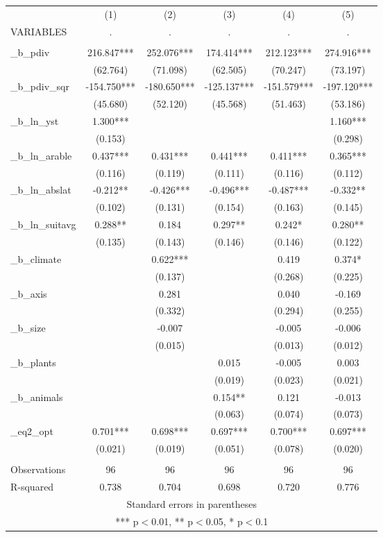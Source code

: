 \documentclass[]{article}
\begin{document}
\begin{tabular}{lccccc} \hline
 & (1) & (2) & (3) & (4) & (5) \\
VARIABLES & . & . & . & . & . \\ \hline
 &  &  &  &  &  \\
\_b\_pdiv & 216.847*** & 252.076*** & 174.414*** & 212.123*** & 274.916*** \\
 & (62.764) & (71.098) & (62.505) & (70.247) & (73.197) \\
\_b\_pdiv\_sqr & -154.750*** & -180.650*** & -125.137*** & -151.579*** & -197.120*** \\
 & (45.680) & (52.120) & (45.568) & (51.463) & (53.186) \\
\_b\_ln\_yst & 1.300*** &  &  &  & 1.160*** \\
 & (0.153) &  &  &  & (0.298) \\
\_b\_ln\_arable & 0.437*** & 0.431*** & 0.441*** & 0.411*** & 0.365*** \\
 & (0.116) & (0.119) & (0.111) & (0.116) & (0.112) \\
\_b\_ln\_abslat & -0.212** & -0.426*** & -0.496*** & -0.487*** & -0.332** \\
 & (0.102) & (0.131) & (0.154) & (0.163) & (0.145) \\
\_b\_ln\_suitavg & 0.288** & 0.184 & 0.297** & 0.242* & 0.280** \\
 & (0.135) & (0.143) & (0.146) & (0.146) & (0.122) \\
\_b\_climate &  & 0.622*** &  & 0.419 & 0.374* \\
 &  & (0.137) &  & (0.268) & (0.225) \\
\_b\_axis &  & 0.281 &  & 0.040 & -0.169 \\
 &  & (0.332) &  & (0.294) & (0.255) \\
\_b\_size &  & -0.007 &  & -0.005 & -0.006 \\
 &  & (0.015) &  & (0.013) & (0.012) \\
\_b\_plants &  &  & 0.015 & -0.005 & 0.003 \\
 &  &  & (0.019) & (0.023) & (0.021) \\
\_b\_animals &  &  & 0.154** & 0.121 & -0.013 \\
 &  &  & (0.063) & (0.074) & (0.073) \\
\_eq2\_opt & 0.701*** & 0.698*** & 0.697*** & 0.700*** & 0.697*** \\
 & (0.021) & (0.019) & (0.051) & (0.078) & (0.020) \\
 &  &  &  &  &  \\
Observations & 96 & 96 & 96 & 96 & 96 \\
 R-squared & 0.738 & 0.704 & 0.698 & 0.720 & 0.776 \\ \hline
\multicolumn{6}{c}{ Standard errors in parentheses} \\
\multicolumn{6}{c}{ *** p$<$0.01, ** p$<$0.05, * p$<$0.1} \\
\end{tabular}
\end{document}
